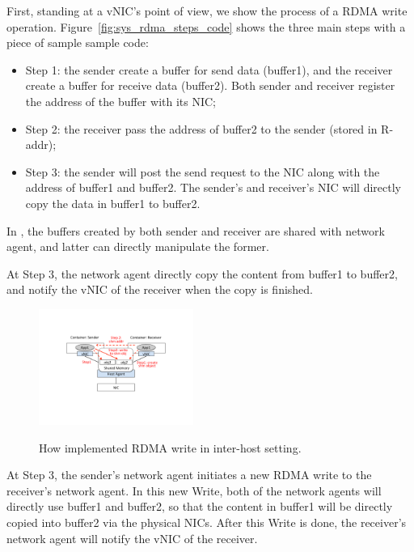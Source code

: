  First, standing at a vNIC's point of view, we show
the process of a RDMA write operation. 
Figure~\ref{fig:sys_rdma_steps_code} shows the three main steps with a piece of sample sample code:
\begin{itemize}
  \item Step 1: the sender create a buffer for send data (buffer1), and the receiver create a buffer for receive data (buffer2). 
Both sender and receiver register the address of the buffer with its NIC;
  \item Step 2: the receiver pass the address of buffer2 to the sender (stored in R-addr);
  \item Step 3: the sender will post the send request to the NIC along with the address of buffer1 and buffer2. The sender's
  and receiver's NIC will directly copy the data in buffer1 to buffer2.
\end{itemize}

In \sysname, the buffers created by both sender and receiver are shared
with network agent, and latter can directly manipulate the former.

 At Step 3, the network agent directly copy the content
from buffer1 to buffer2, and notify the vNIC of the receiver when the copy is
finished. 

     \begin{figure}[ht]
     \centering 
     \includegraphics[width=0.45\textwidth]{figures/system/sys_rdma_shm.pdf}      
     \label{fig:sys_rdma_shm}
     \caption{How \sysname implemented RDMA write in inter-host setting.} 
     \end{figure}


 At Step 3, the sender's network agent initiates a
new RDMA write to the receiver's network agent. In this new Write, 
both of the network agents will directly use buffer1 and buffer2, so that
the content in buffer1 will be directly copied into buffer2 via
the physical NICs. After this Write is done, the receiver's network agent
will notify the vNIC of the receiver. 

